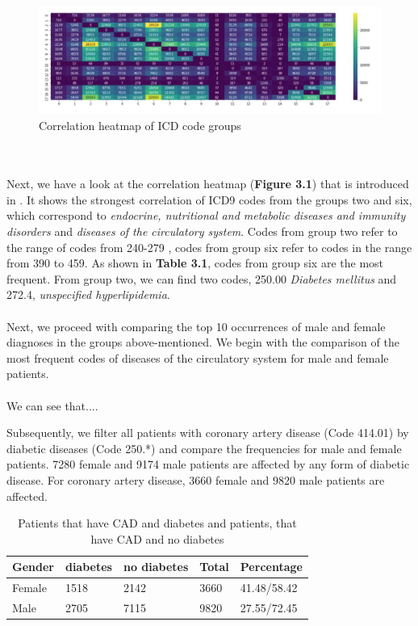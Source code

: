\documentclass[11pt, a4paper]{book}
\begin{document}
\begin{figure}
  \begin{center}
  \includegraphics[width=1\textwidth]{img/correlation-heatmap.png}
  \caption{Correlation heatmap of ICD code groups \cite{arya2019exploratory}}
  \label{fig:correlation-heatmap}
  \end{center}
\end{figure}


\\
\\
Next, we have a look at the correlation heatmap (\textbf{Figure 3.1}) that is introduced in \cite{arya2019exploratory}. It shows the strongest correlation of ICD9 codes from the groups two and six, which correspond to \textit{endocrine, nutritional and metabolic diseases and immunity disorders} and \textit{diseases of the circulatory system}. Codes from group two refer to the range of codes from 240-279 , codes from group six refer to codes in the range from 390 to 459. As shown in \textbf{Table 3.1}, codes from group six are the most frequent. From group two, we can find two codes, 250.00 \textit{Diabetes mellitus} and 272.4, \textit{unspecified hyperlipidemia}.
\\
\\
Next, we proceed with comparing the top 10 occurrences of male and female diagnoses in the groups above-mentioned. We begin with the comparison of the most frequent codes of diseases of the circulatory system for male and female patients.
\\
\\
We can see that....

Subsequently, we filter all patients with coronary artery disease (Code 414.01) by diabetic diseases (Code 250.*) and compare the frequencies for male and female patients. 7280 female and 9174 male patients are affected by any form of diabetic disease.
For coronary artery disease, 3660 female and 9820 male patients are affected. 


\begin{table}
\begin{center}
\begin{tabular}{l|l|l|l|l}
Gender & diabetes & no diabetes & Total & Percentage\\
\hline
Female & 1518 & 2142 & 3660 & 41.48/58.42\\
Male 	& 2705 & 7115 & 9820 & 27.55/72.45\\
\end{tabular}
\caption{\label{tab:cad-diabetic}Patients that have CAD and diabetes and patients, that have CAD and no diabetes}
\end{center}
\end{table}
\end{document}

